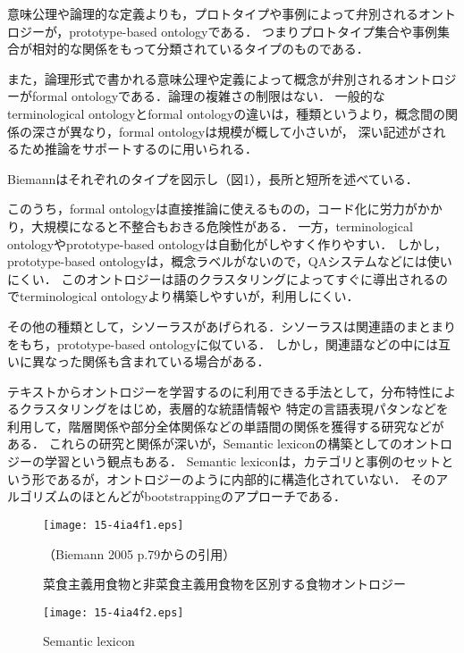 \documentclass[japanese]{jnlp_1.4}
\begin{document}
意味公理や論理的な定義よりも，プロトタイプや事例によって弁別されるオントロジーが，prototype-based ontologyである．
つまりプロトタイプ集合や事例集合が相対的な関係をもって分類されているタイプのものである．

また，論理形式で書かれる意味公理や定義によって概念が弁別されるオントロジーがformal ontologyである．論理の複雑さの制限はない．
一般的なterminological ontologyとformal ontologyの違いは，種類というより，概念間の関係の深さが異なり，formal ontologyは規模が概して小さいが，
深い記述がされるため推論をサポートするのに用いられる．

Biemannはそれぞれのタイプを図示し（図1），長所と短所を述べている\cite{Article_03}．

このうち，formal ontologyは直接推論に使えるものの，コード化に労力がかかり，大規模になると不整合もおきる危険性がある．
一方，terminological ontologyやprototype-based ontologyは自動化がしやすく作りやすい．
しかし，prototype-based ontologyは，概念ラベルがないので，QAシステムなどには使いにくい．
このオントロジーは語のクラスタリングによってすぐに導出されるのでterminological ontologyより構築しやすいが，利用しにくい．

その他の種類として，シソーラスがあげられる．シソーラスは関連語のまとまりをもち，prototype-based ontologyに似ている．
しかし，関連語などの中には互いに異なった関係も含まれている場合がある．

テキストからオントロジーを学習するのに利用できる手法として，分布特性によるクラスタリングをはじめ，表層的な統語情報や
特定の言語表現パタンなどを利用して，階層関係や部分全体関係などの単語間の関係を獲得する研究などが
ある\cite{Inproc_10,Inproc_09,Inproc_05,Inproc_04}．
これらの研究と関係が深いが，Semantic lexiconの構築としてのオントロジーの学習という観点もある．
Semantic lexiconは，カテゴリと事例のセットという形であるが，オントロジーのように内部的に構造化されていない．
そのアルゴリズムのほとんどがbootstrappingのアプローチである\cite{Inproc_29,Inproc_36,Inproc_18,Inproc_27}．

\begin{figure}[t]
\begin{center}
\texttt{[image: 15-4ia4f1.eps]}
\caption{菜食主義用食物と非菜食主義用食物を区別する食物オントロジー}
    （Biemann 2005\nocite{Article_03} p.79からの引用）
\end{center}
\end{figure}
\begin{figure}[t]
\begin{center}
\texttt{[image: 15-4ia4f2.eps]}
\end{center}
\caption{Semantic lexicon}
\end{figure}
\end{document}

